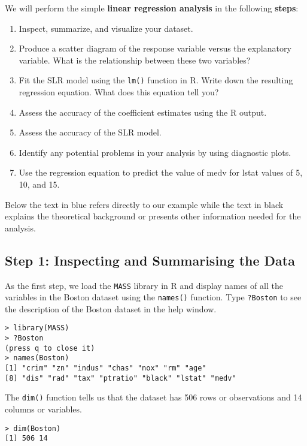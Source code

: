 \documentclass[11pt]{article}
\begin{document}
We will perform the simple \textbf{linear regression analysis} in the following \textbf{steps}:

\begin{enumerate}
    \item Inspect, summarize, and visualize your dataset.
    \item Produce a scatter diagram of the response variable versus the explanatory variable. What is the relationship between these two variables?
    \item Fit the SLR model using the \texttt{lm()} function in R. Write down the resulting regression equation. What does this equation tell you?
    \item Assess the accuracy of the coefficient estimates using the R output.
    \item Assess the accuracy of the SLR model.
    \item Identify any potential problems in your analysis by using diagnostic plots.
    \item Use the regression equation to predict the value of medv for lstat values of 5, 10, and 15.
\end{enumerate}

Below the text in blue refers directly to our example while the text in black explains the theoretical background or presents other information needed for the analysis.

\subsection{Step 1: Inspecting and Summarising the Data}

As the first step, we load the \texttt{MASS} library in R and display names of all the variables in the Boston dataset using the \texttt{names()} function. Type \texttt{?Boston} to see the description of the Boston dataset in the help window.

\begin{verbatim}
> library(MASS)
> ?Boston
(press q to close it)
> names(Boston)
[1] "crim" "zn" "indus" "chas" "nox" "rm" "age"
[8] "dis" "rad" "tax" "ptratio" "black" "lstat" "medv"
\end{verbatim}

The \texttt{dim()} function tells us that the dataset has 506 rows or observations and 14 columns or variables.

\begin{verbatim}
> dim(Boston)
[1] 506 14
\end{verbatim}
\end{document}
